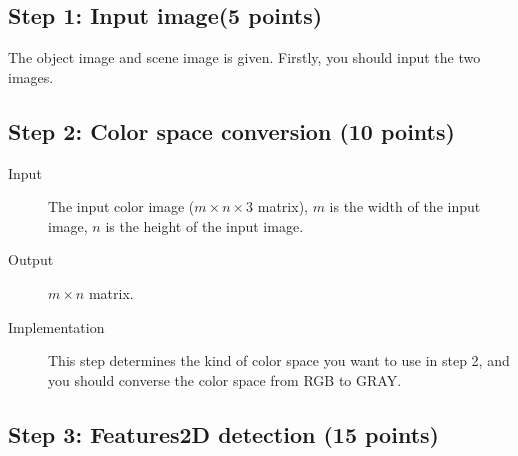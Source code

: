 \documentclass[12pt]{article}
\begin{document}
\subsection{Step 1: Input image(5 points)}

The object image and scene image is given. Firstly, you should input the two images.

\subsection{Step 2: Color space conversion (10 points)}

\begin{description}
\item[Input] The input color image ($m \times n \times 3$ matrix), $m$ is the width of the input image, $n$ is the height of the input image.
\item[Output] $m \times n$ matrix. 
\item[Implementation] This step determines the kind of color space you want to use in step 2, and you should converse the color space from RGB to GRAY.
\end{description}

\subsection{Step 3: Features2D detection (15 points)}
\end{document}
